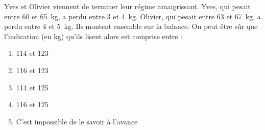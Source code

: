 Yves et Olivier viennent de terminer leur régime amaigrissant. Yves,
qui pesait entre 60 et 65~kg, a perdu entre 3 et 4~kg. Olivier, qui
pesait entre 63 et 67~kg, a perdu entre 4 et 5~kg. Ils montent
ensemble sur la balance. On peut être sûr que l'indication (en kg)
qu'ils lisent alors est comprise entre :
\begin{multicols}{3}
  \begin{enumerate}[A/]
  \item 114 et 123
  \item 116 et 123
  \item 114 et 125
  \item 116 et 125
  \item C'est impossible de le savoir à l'avance
  \end{enumerate}
\end{multicols}